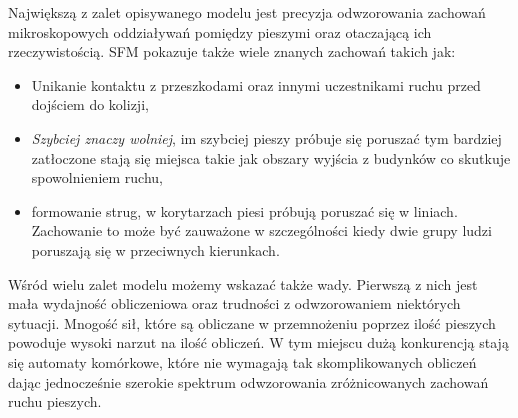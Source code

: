 Największą z zalet opisywanego modelu jest precyzja odwzorowania zachowań mikroskopowych oddziaływań pomiędzy pieszymi oraz otaczającą ich rzeczywistością. SFM pokazuje także wiele znanych zachowań takich jak:

\begin{itemize}
\item Unikanie kontaktu z przeszkodami oraz innymi uczestnikami ruchu przed dojściem do kolizji,
\item \textit{Szybciej znaczy wolniej}, im szybciej pieszy próbuje się poruszać tym bardziej zatłoczone stają się miejsca takie jak obszary wyjścia z budynków co skutkuje spowolnieniem ruchu,
\item formowanie strug, w korytarzach piesi próbują poruszać się w liniach. Zachowanie to może być zauważone w szczególności kiedy dwie grupy ludzi poruszają się w przeciwnych kierunkach.
\end{itemize}
Wśród wielu zalet modelu możemy wskazać także wady. Pierwszą z nich jest mała wydajność obliczeniowa oraz trudności z odwzorowaniem niektórych sytuacji. Mnogość sił, które są obliczane w przemnożeniu poprzez ilość pieszych powoduje wysoki narzut na ilość obliczeń. W tym miejscu dużą konkurencją stają się automaty komórkowe, które nie wymagają tak skomplikowanych obliczeń dając jednocześnie szerokie spektrum odwzorowania zróżnicowanych zachowań ruchu pieszych.
